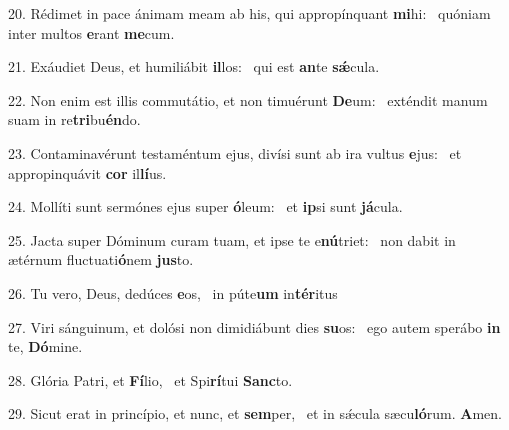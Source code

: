 20. Rédimet in pace ánimam meam ab his, qui appropínquant \textbf{mi}hi: \ast\  quóniam inter multos \textbf{e}rant \textbf{me}cum.\

21. Exáudiet Deus, et humiliábit \textbf{il}los: \ast\  qui est \textbf{an}te \textbf{sǽ}cula.\

22. Non enim est illis commutátio, et non timuérunt \textbf{De}um: \ast\  exténdit manum suam in re\textbf{tri}bu\textbf{én}do.\

23. Contaminavérunt testaméntum ejus, divísi sunt ab ira vultus \textbf{e}jus: \ast\  et appropinquávit \textbf{cor} il\textbf{lí}us.\

24. Mollíti sunt sermónes ejus super \textbf{ó}leum: \ast\  et \textbf{ip}si sunt \textbf{já}cula.\

25. Jacta super Dóminum curam tuam, et ipse te e\textbf{nú}triet: \ast\  non dabit in ætérnum fluctuati\textbf{ó}nem \textbf{jus}to.\

26. Tu vero, Deus, dedúces \textbf{e}os, \ast\  in púte\textbf{um} in\textbf{tér}itus\

27. Viri sánguinum, et dolósi non dimidiábunt dies \textbf{su}os: \ast\  ego autem sperábo \textbf{in} te, \textbf{Dó}mine.\

28. Glória Patri, et \textbf{Fí}lio, \ast\  et Spi\textbf{rí}tui \textbf{Sanc}to.\

29. Sicut erat in princípio, et nunc, et \textbf{sem}per, \ast\  et in sǽcula sæcu\textbf{ló}rum. \textbf{A}men.\

